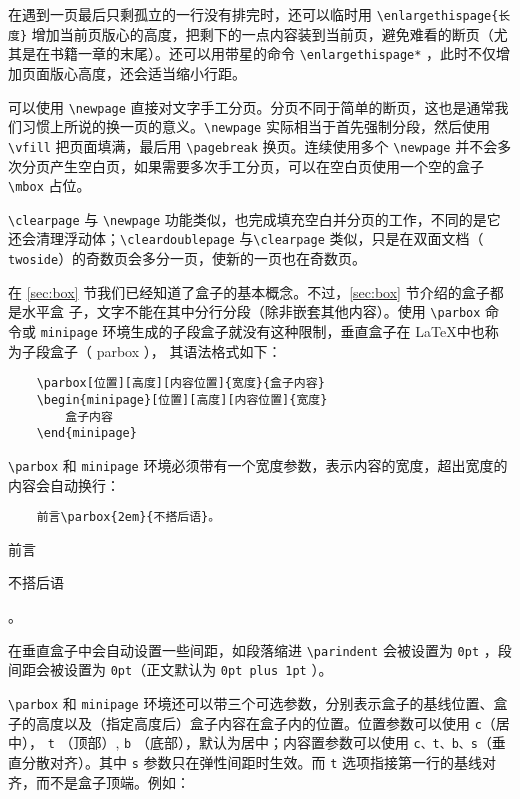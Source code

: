 在遇到一页最后只剩孤立的一行没有排完时，还可以临时用 \verb|\enlargethispage{长度}| 增加当前页版心的高度，把剩下的一点内容装到当前页，避免难看的断页（尤其是在书籍一章的末尾）。还可以用带星的命令 \verb|\enlargethispage*| ，此时不仅增加页面版心高度，还会适当缩小行距。

可以使用 \verb|\newpage| 直接对文字手工分页。分页不同于简单的断页，这也是通常我们习惯上所说的换一页的意义。\verb|\newpage| 实际相当于首先强制分段，然后使用 \verb|\vfill| 把页面填满，最后用 \verb|\pagebreak| 换页。连续使用多个 \verb|\newpage| 并不会多次分页产生空白页，如果需要多次手工分页，可以在空白页使用一个空的盒子\verb|\mbox| 占位。

\verb|\clearpage| 与 \verb|\newpage| 功能类似，也完成填充空白并分页的工作，不同的是它
还会清理浮动体；\verb|\cleardoublepage| 与\verb|\clearpage| 类似，只是在双面文档（ \verb|twoside|）的奇数页会多分一页，使新的一页也在奇数页。

在 \ref{sec:box} 节我们已经知道了盒子的基本概念。不过，\ref{sec:box} 节介绍的盒子都是水平盒
子，文字不能在其中分行分段（除非嵌套其他内容）。使用 \verb|\parbox| 命令或 \verb|minipage|
环境生成的子段盒子就没有这种限制，垂直盒子在 \LaTeX 中也称为子段盒子（ parbox ），
其语法格式如下：

\begin{lstlisting}
    \parbox[位置][高度][内容位置]{宽度}{盒子内容}
    \begin{minipage}[位置][高度][内容位置]{宽度}
        盒子内容
    \end{minipage}
\end{lstlisting}

\verb|\parbox| 和 \verb|minipage| 环境必须带有一个宽度参数，表示内容的宽度，超出宽度的
内容会自动换行：

\begin{minipage}[t]{0.45\textwidth}
\begin{lstlisting}
    前言\parbox{2em}{不搭后语}。
\end{lstlisting}
\end{minipage}
\hfill
\begin{minipage}[t]{0.45\textwidth}
    前言\parbox{2em}{不搭后语}。
\end{minipage}

在垂直盒子中会自动设置一些间距，如段落缩进 \verb|\parindent| 会被设置为 \verb|0pt| ，段
间距会被设置为 \verb|0pt|（正文默认为 \verb|0pt plus 1pt| ）。

\verb|\parbox| 和 \verb|minipage| 环境还可以带三个可选参数，分别表示盒子的基线位置、盒
子的高度以及（指定高度后）盒子内容在盒子内的位置。位置参数可以使用 \verb|c|（居中），
\verb|t| （顶部）, \verb|b| （底部），默认为居中；内容置参数可以使用 \verb|c、t、b、s|（垂直分散对齐）。其中 \verb|s| 参数只在弹性间距时生效。而 \verb|t| 选项指接第一行的基线对齐，而不是盒子顶端。例如：

